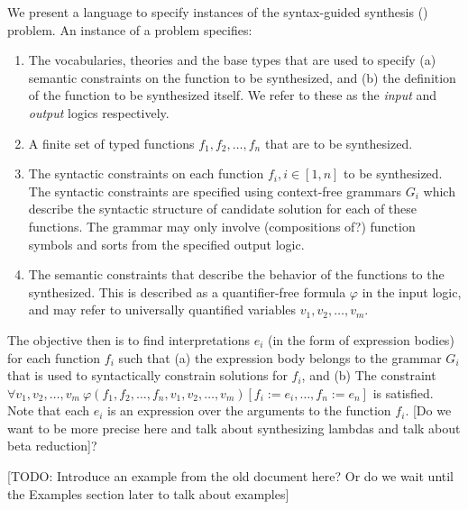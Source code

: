 We present a language to specify instances of the syntax-guided synthesis
(\sygustm) problem. An instance of a \sygustm problem specifies:

\begin{enumerate}
\item
  The vocabularies, theories and the base types that are used to specify
  (a) semantic constraints on the function to be synthesized, and (b) the
  definition of the function to be synthesized itself. We refer to these as
  the \emph{input} and \emph{output} logics respectively.
\item
  A finite set of typed functions $f_1, f_2, \ldots, f_n$ that are to be synthesized.
\item
  The syntactic constraints on each function $f_i, i \in [1,n]$ to be
  synthesized. The syntactic constraints are specified using context-free
  grammars $G_i$ which describe the syntactic structure of candidate
  solution for each of these functions.
  The grammar may only involve (compositions of?) function
  symbols and sorts from the specified output logic.
\item
  The semantic constraints that describe the behavior of the functions to
  the synthesized. This is described as a quantifier-free formula $\varphi$
  in the input logic, and may refer to universally quantified variables
  $v_1, v_2, \ldots, v_m$.
\end{enumerate}

The objective then is to find interpretations $e_i$ (in the form of
expression bodies) for each function $f_i$ such that (a) the expression
body belongs to the grammar $G_i$ that is used to syntactically constrain
solutions for $f_i$, and (b) The constraint $\forall v_1, v_2, \ldots,
v_m\ \varphi(f_1, f_2, \ldots, f_n, v_1, v_2, \ldots, v_m)[f_i \mathtt{:=}
  e_i, \ldots, f_n \mathtt{:=} e_n] $ is satisfied. Note that each $e_i$ is
an expression over the arguments to the function $f_i$. [Do we want to be
  more precise here and talk about synthesizing lambdas and talk about beta
  reduction]?

[TODO: Introduce an example from the old document here? Or do we wait until
  the Examples section later to talk about examples]

